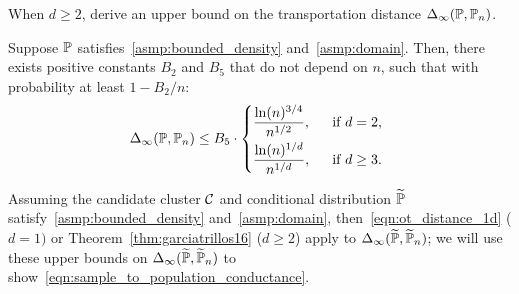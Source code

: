 When $d \geq 2$, \cite{garciatrillos16b} derive an upper bound on the transportation distance $\Delta_{\infty}(\mathbb{P},\mathbb{P}_n)$.
\begin{theorem}
	\label{thm:garciatrillos16}
	Suppose $\mathbb{P}$ satisfies~\ref{asmp:bounded_density} and~\ref{asmp:domain}. Then, there exists positive constants $B_{2}$ and $B_5$ that do not depend on $n$, such that with probability at least $1 - B_2/n$:
	\begin{equation*}
	\Delta_{\infty}(\mbb{P},\mbb{P}_n) \leq B_5 \cdot 
	\begin{dcases*}
	\frac{\ln(n)^{3/4}}{n^{1/2}},&~~\textrm{if $d = 2$,} \\
	\frac{\ln(n)^{1/d}}{n^{1/d}},&~~\textrm{if $d \geq 3$.}
	\end{dcases*}
	\end{equation*}
\end{theorem}
Assuming the candidate cluster $\mathcal{C}$ and conditional distribution $\widetilde{\mathbb{P}}$ satisfy~\ref{asmp:bounded_density} and~\ref{asmp:domain}, then~\eqref{eqn:ot_distance_1d} ($d = 1)$ or Theorem~\ref{thm:garciatrillos16} ($d \geq 2$) apply to $\Delta_{\infty}(\widetilde{\mathbb{P}},\widetilde{\mathbb{P}}_n)$; we will use these upper bounds on $\Delta_{\infty}(\widetilde{\mathbb{P}},\widetilde{\mathbb{P}}_n)$ to show~\eqref{eqn:sample_to_population_conductance}.  

